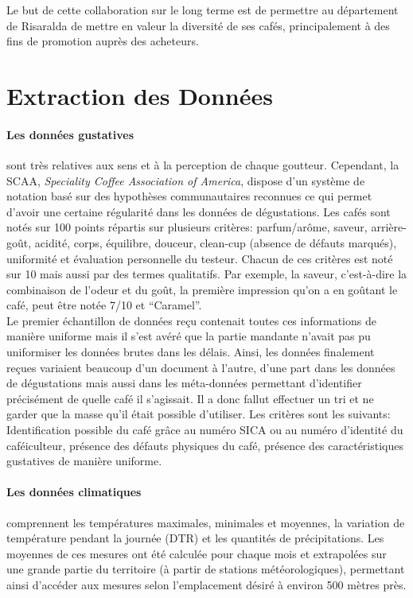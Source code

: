 Le but de cette collaboration sur le long terme est de permettre au département de Risaralda de mettre en valeur la diversité de ses cafés, principalement à des fins de promotion auprès des acheteurs. 

\newpage
\section{Extraction des Données}
\paragraph{Les données gustatives}sont très relatives aux sens et à la perception de chaque goutteur. Cependant, la SCAA, \textit{Speciality Coffee Association of America}, dispose d’un système de notation basé sur des hypothèses communautaires reconnues ce qui permet d’avoir une certaine régularité dans les données de dégustations. Les cafés sont notés sur 100 points répartis sur plusieurs critères: parfum/arôme, saveur, arrière-goût, acidité, corps, équilibre, douceur, clean-cup (absence de défauts marqués), uniformité et évaluation personnelle du testeur.  Chacun de ces critères est noté sur 10 mais aussi par des termes qualitatifs. Par exemple, la saveur, c’est-à-dire la combinaison de l’odeur et du goût, la première impression qu’on a en goûtant le café, peut être notée 7/10 et “Caramel”. \\

Le premier échantillon de données reçu contenait toutes ces informations de manière uniforme mais il s'est avéré que la partie mandante n'avait pas pu uniformiser les données brutes dans les délais. Ainsi, les données finalement reçues variaient beaucoup d'un document à l'autre, d'une part dans les données de dégustations mais aussi dans les méta-données permettant d'identifier précisément de quelle café il s'agissait. Il a donc fallut effectuer un tri et ne garder que la masse qu'il était possible d'utiliser. Les critères sont les suivants: Identification possible du café grâce au numéro SICA ou au numéro d'identité du caféiculteur, présence des défauts physiques du café, présence des caractéristiques gustatives de manière uniforme.\\

 

\paragraph{Les données climatiques}comprennent les températures maximales, minimales et moyennes, la variation de température pendant la journée (DTR) et les quantités de précipitations. Les moyennes de ces mesures ont été calculée pour chaque mois et extrapolées sur une grande partie du territoire (à partir de stations météorologiques), permettant ainsi d’accéder aux mesures selon l’emplacement désiré à environ 500 mètres près. \\

